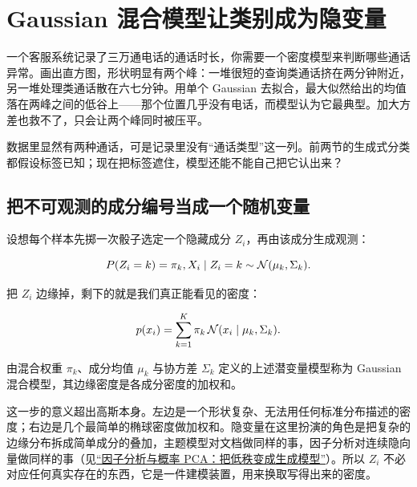 \section{Gaussian 混合模型让类别成为隐变量}
\label{sec:13-Machine-Learning/06-Probabilistic-Models/03}

一个客服系统记录了三万通电话的通话时长，你需要一个密度模型来判断哪些通话异常。画出直方图，形状明显有两个峰：一堆很短的查询类通话挤在两分钟附近，另一堆处理类通话散在六七分钟。用单个 Gaussian 去拟合，最大似然给出的均值落在两峰之间的低谷上——那个位置几乎没有电话，而模型认为它最典型。加大方差也救不了，只会让两个峰同时被压平。

数据里显然有两种通话，可是记录里没有``通话类型''这一列。前两节的生成式分类都假设标签已知；现在把标签遮住，模型还能不能自己把它认出来？

\subsection{把不可观测的成分编号当成一个随机变量}

设想每个样本先掷一次骰子选定一个隐藏成分 \(Z_i\)，再由该成分生成观测：

\[
P(Z_i=k)=\pi_k,\space
X_i\mid Z_i=k\sim\mathcal N(\mu_k,\Sigma_k).
\]

把 \(Z_i\) 边缘掉，剩下的就是我们真正能看见的密度：

\[
p(x_i)=\sum_{k=1}^K\pi_k\,\mathcal N(x_i\mid\mu_k,\Sigma_k).
\]

\begin{definition}
由混合权重 \(\pi_k\)、成分均值 \(\mu_k\) 与协方差 \(\Sigma_k\) 定义的上述潜变量模型称为 Gaussian 混合模型，其边缘密度是各成分密度的加权和。
\end{definition}

这一步的意义超出高斯本身。左边是一个形状复杂、无法用任何标准分布描述的密度；右边是几个最简单的椭球密度做加权和。隐变量在这里扮演的角色是把复杂的边缘分布拆成简单成分的叠加，主题模型对文档做同样的事，因子分析对连续隐向量做同样的事（见\hyperref[sec:13-Machine-Learning/04-Dimensionality-Reduction/06]{``因子分析与概率 PCA：把低秩变成生成模型''}）。所以 \(Z_i\) 不必对应任何真实存在的东西，它是一件建模装置，用来换取写得出来的密度。

